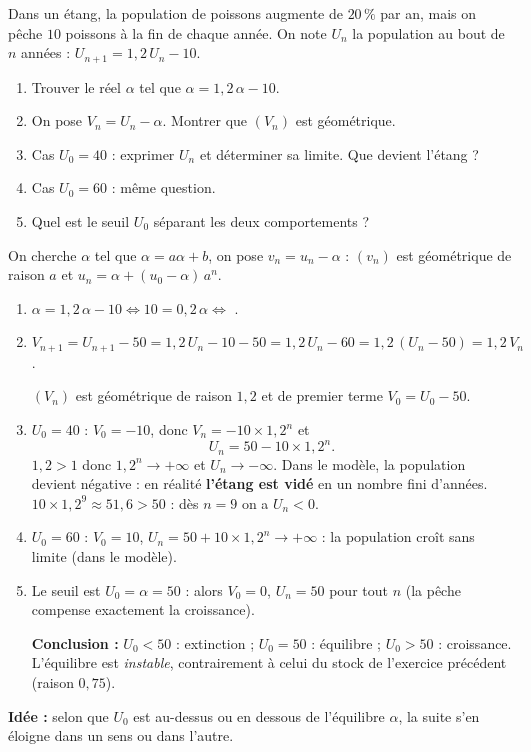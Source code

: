 
Dans un étang, la population de poissons augmente de $20\,\%$ par an, mais on pêche $10$ poissons à la fin de chaque année. On note $U_n$ la population au bout de $n$ années : $U_{n+1}=1{,}2\,U_n-10$.

\begin{enumerate}
  \item Trouver le réel $\alpha$ tel que $\alpha=1{,}2\,\alpha-10$.
  \item On pose $V_n=U_n-\alpha$. Montrer que $(V_n)$ est géométrique.
  \item Cas $U_0=40$ : exprimer $U_n$ et déterminer sa limite. Que devient l'étang ?
  \item Cas $U_0=60$ : même question.
  \item Quel est le seuil $U_0$ séparant les deux comportements ?
\end{enumerate}

\begin{prop}[Méthode pour $u_{n+1}=a\,u_n+b$]
On cherche $\alpha$ tel que $\alpha=a\alpha+b$, on pose $v_n=u_n-\alpha$ : $(v_n)$ est géométrique de raison $a$ et $u_n=\alpha+(u_0-\alpha)\,a^n$.
\end{prop}
\begin{enumerate}
  \item $\alpha=1{,}2\,\alpha-10\iff10=0{,}2\,\alpha\iff$ .
  \item $V_{n+1}=U_{n+1}-50=1{,}2\,U_n-10-50=1{,}2\,U_n-60=1{,}2\,(U_n-50)=1{,}2\,V_n$.

  $(V_n)$ est géométrique de raison $1{,}2$ et de premier terme $V_0=U_0-50$.
  \item $U_0=40$ : $V_0=-10$, donc $V_n=-10\times1{,}2^n$ et
  $$U_n=50-10\times1{,}2^n.$$
  $1{,}2>1$ donc $1{,}2^n\to+\infty$ et $U_n\to-\infty$. Dans le modèle, la population devient négative : en réalité \textbf{l'étang est vidé} en un nombre fini d'années. $10\times1{,}2^9\approx51{,}6>50$ : dès $n=9$ on a $U_n<0$.
  \item $U_0=60$ : $V_0=10$, $U_n=50+10\times1{,}2^n\to+\infty$ : la population croît sans limite (dans le modèle).
  \item Le seuil est $U_0=\alpha=50$ : alors $V_0=0$, $U_n=50$ pour tout $n$ (la pêche compense exactement la croissance).

  \textbf{Conclusion :} $U_0<50$ : extinction ; $U_0=50$ : équilibre ; $U_0>50$ : croissance. L'équilibre est \emph{instable}, contrairement à celui du stock de l'exercice précédent (raison $0{,}75$).
\end{enumerate}

\textbf{Idée :} selon que $U_0$ est au-dessus ou en dessous de l'équilibre $\alpha$, la suite s'en éloigne dans un sens ou dans l'autre.

